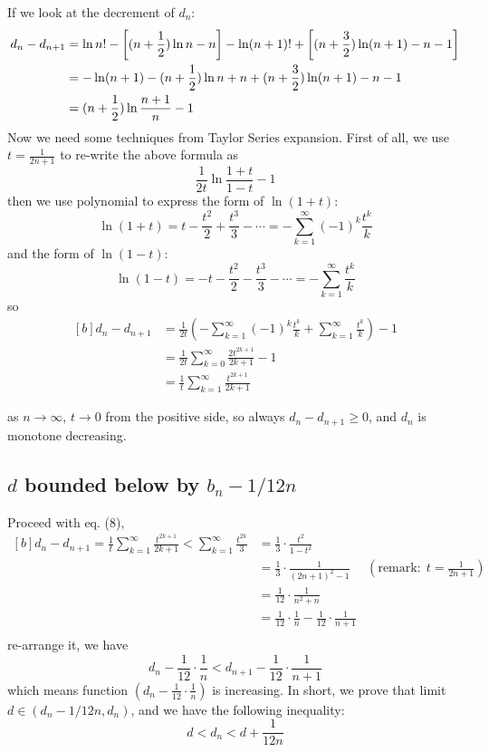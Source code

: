 \documentclass[11pt]{article}
\begin{document}
If we look at the decrement of $d_n$:
$$
\begin{aligned}[t]
d_n - d_{n+1}
    &=  \ln n! - \left[(n + \frac{1}{2}) \ln n - n \right]  -  \ln (n+1)! + \left[(n + \frac{3}{2}) \ln (n+1) - n - 1 \right] \\
    &= - \ln (n+1)-  (n + \frac{1}{2}) \ln n + n +  (n + \frac{3}{2}) \ln (n+1) - n - 1  \\
    &= (n + \frac{1}{2}) \ln \frac{n+1}{n} - 1  \\
\end{aligned}\\
$$
Now we need some techniques from Taylor Series expansion.  First of all,  we use $t= \displaystyle  \frac{1}{2n+1}$ to re-write the above formula as
$$ \frac{1}{2t} \ln \frac{1+t}{1-t} -1 $$
then we use polynomial to express the form of $\ln (1+t)$:
$$ \ln (1+t) = t - \frac{t^2}{2} + \frac{t^3}{3} - \cdots =  - \sum _{k=1} ^\infty (-1)^k \frac{t^k}{k} $$
and the form of $\ln (1-t)$:
$$ \ln (1-t) = -t -  \frac{t^2}{2} - \frac{t^3}{3} - \cdots = - \sum _{k=1} ^\infty \frac{t^k}{k} $$
so
\begin{equation}
\begin{aligned}[b]
 d_n - d_{n+1} 
 	&= \frac{1}{2t} \left(  - \sum _{k=1} ^\infty (-1)^k \frac{t^k}{k} +  \sum _{k=1} ^\infty \frac{t^k}{k} \right) -1 \\
 	&= \frac{1}{2t} \sum _{k=0} ^\infty \frac{2t^{2k+1}} {2k+1}  -1 \\
	&=  \frac{1}{t} \sum _{k=1} ^\infty \frac{t^{2k+1}} {2k+1} 
\end{aligned}
\end{equation}


as $n \to \infty$,  $t \to 0$ from the positive side,  so always $ d_n - d_{n+1} \geqslant 0 $,  and $d_n$ is monotone decreasing. \\


\subsection{\normalsize $d$ bounded below by $b_n - 1/12n$}

Proceed with eq. (8), 
$$
\begin{aligned}[b]
 d_n - d_{n+1} =  \frac{1}{t} \sum _{k=1} ^\infty \frac{t^{2k+1}} {2k+1} < \sum _{k=1} ^\infty \frac{t^{2k}} {3} 
 	&= \frac{1}{3} \cdot \frac{t^2}{1- t^2} \\
	&= \frac{1}{3} \cdot \frac{1}{(2n+1)^2 -1}  & (\text{remark:} \ \  t=\frac{1}{2n+1}) \\
	&= \frac{1}{12} \cdot \frac{1}{n^2 + n} \\
	&= \frac{1}{12} \cdot \frac{1}{n} - \frac{1}{12} \cdot \frac{1}{n+1}\\
\end{aligned}
$$
re-arrange it,  we have
$$
 d_n - \frac{1}{12} \cdot \frac{1}{n}  < d_{n+1} - \frac{1}{12} \cdot \frac{1}{n+1} 
$$
which means function $ \displaystyle \left( d_n - \frac{1}{12} \cdot \frac{1}{n} \right) $ is increasing.  In short,  we prove that limit $d \in (d_n - 1/12n, d_n)$,  and we have the following inequality:
\begin{equation}
d < d_n < d + \frac{1}{12n} 
\end{equation}
\end{document}
